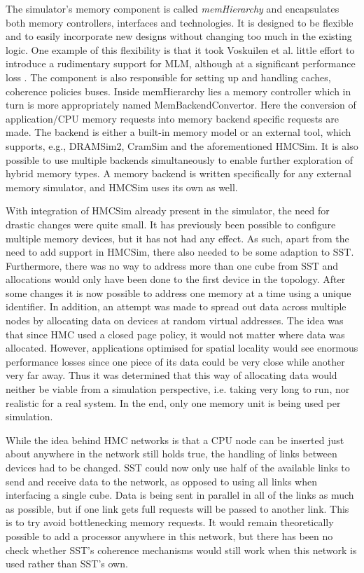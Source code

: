 The simulator's memory component is called \emph{memHierarchy} and encapsulates both memory controllers, interfaces and technologies. It is designed to be flexible and to easily incorporate new designs without changing too much in the existing logic. One example of this flexibility is that it took Voskuilen et al. little effort to introduce a rudimentary support for MLM, although at a significant performance loss \cite{voskuilen2018analyzing}. The component is also responsible for setting up and handling caches, coherence policies buses. Inside memHierarchy lies a memory controller which in turn is more appropriately named MemBackendConvertor. Here the conversion of application/CPU memory requests into memory backend specific requests are made. The backend is either a built-in memory model or an external tool, which supports, e.g., DRAMSim2, CramSim and the aforementioned HMCSim. It is also possible to use multiple backends simultaneously to enable further exploration of hybrid memory types. A memory backend is written specifically for any external memory simulator, and HMCSim uses its own as well.
\bigskip

With integration of HMCSim already present in the simulator, the need for drastic changes were quite small. It has previously been possible to configure multiple memory devices, but it has not had any effect. As such, apart from the need to add support in HMCSim, there also needed to be some adaption to SST. Furthermore, there was no way to address more than one cube from SST and allocations would only have been done to the first device in the topology. After some changes it is now possible to address one memory at a time using a unique identifier. In addition, an attempt was made to spread out data across multiple nodes by allocating data on devices at random virtual addresses. The idea was that since HMC used a closed page policy, it would not matter where data was allocated. However, applications optimised for spatial locality would see enormous performance losses since one piece of its data could be very close while another very far away. Thus it was determined that this way of allocating data would neither be viable from a simulation perspective, i.e. taking very long to run, nor realistic for a real system. In the end, only one memory unit is being used per simulation.
\bigskip

While the idea behind HMC networks is that a CPU node can be inserted just about anywhere in the network still holds true, the handling of links between devices had to be changed. SST could now only use half of the available links to send and receive data to the network, as opposed to using all links when interfacing a single cube. Data is being sent in parallel in all of the links as much as possible, but if one link gets full requests will be passed to another link. This is to try avoid bottlenecking memory requests. It would remain theoretically possible to add a processor anywhere in this network, but there has been no check whether SST's coherence mechanisms would still work when this network is used rather than SST's own. 
\bigskip

